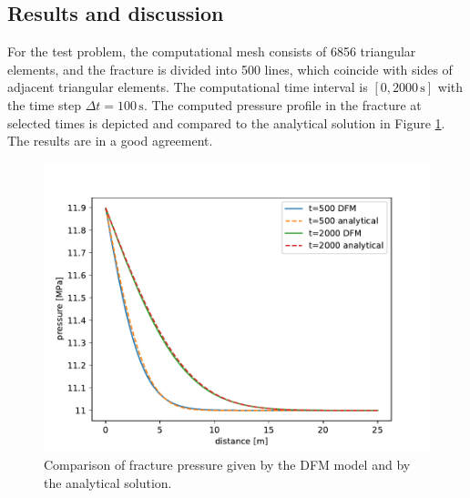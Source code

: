 \documentclass[a4paper]{article}
\numberwithin{equation}{section}
\begin{document}
\subsection{Results and discussion}
For the test problem, the computational mesh consists of 6856 triangular elements, and the fracture is divided into 500 lines, which coincide with sides of adjacent triangular elements.
The computational time interval is $[0,2000\,\mbox{s}]$ with the time step $\Delta t=100\,\mbox{s}$.
% 
The computed pressure profile in the fracture at selected times is depicted and compared to the analytical solution in Figure \ref{fig:test_solution}.
The results are in a good agreement.
\begin{figure}[h]
\centering
\includegraphics[width=\textwidth,ext=.png]{figures/conv_result_linear.yaml_dt_100_cond_9.81e-18_Er_6e+10_Ef_1e+06_nur_0_nuf_0_beta_1_pressure.pdf}
\caption{Comparison of fracture pressure given by the DFM model and by the analytical solution.}
\label{fig:test_solution}
\end{figure}
\end{document}
